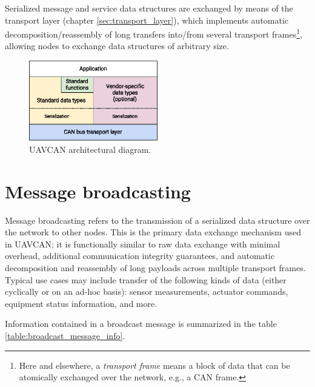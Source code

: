 Serialized message and service data structures are exchanged by means of the transport
layer (chapter \ref{sec:transport_layer}),
which implements automatic decomposition/reassembly of long transfers into/from several transport
frames\footnote{Here and elsewhere, a \emph{transport frame} means a block of data
that can be atomically exchanged over the network, e.g., a CAN frame.},
allowing nodes to exchange data structures of arbitrary size.

\begin{figure}[hbt]
    \centering
	\includegraphics[width=0.5\textwidth]{basic_concepts/Architecture}
	\caption{UAVCAN architectural diagram.\label{fig:architecture}}
\end{figure}

\section{Message broadcasting}

Message broadcasting refers to the transmission of a serialized data structure over the network to other nodes.
This is the primary data exchange mechanism used in UAVCAN;
it is functionally similar to raw data exchange with minimal overhead,
additional communication integrity guarantees, and automatic decomposition and reassembly of long payloads
across multiple transport frames.
Typical use cases may include transfer of the following kinds of data (either cyclically or on an ad-hoc basis):
sensor measurements, actuator commands, equipment status information, and more.

Information contained in a broadcast message is summarized in the table \ref{table:broadcast_message_info}.

